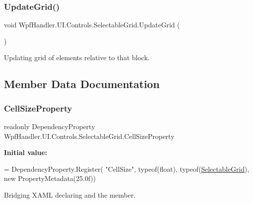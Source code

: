 \subsubsection{\texorpdfstring{Update\+Grid()}{UpdateGrid()}}
{\footnotesize\ttfamily void Wpf\+Handler.\+U\+I.\+Controls.\+Selectable\+Grid.\+Update\+Grid (\begin{DoxyParamCaption}{ }\end{DoxyParamCaption})}



Updating grid of elements relative to that block. 



\subsection{Member Data Documentation}
\mbox{\label{class_wpf_handler_1_1_u_i_1_1_controls_1_1_selectable_grid_af2a964404379788302d8cc9665bcad24}} 
\subsubsection{\texorpdfstring{Cell\+Size\+Property}{CellSizeProperty}}
{\footnotesize\ttfamily readonly Dependency\+Property Wpf\+Handler.\+U\+I.\+Controls.\+Selectable\+Grid.\+Cell\+Size\+Property\hspace{0.3cm}{\ttfamily [static]}}

{\bfseries Initial value\+:}
\begin{DoxyCode}
= DependencyProperty.Register(
            \textcolor{stringliteral}{"CellSize"}, typeof(\textcolor{keywordtype}{float}), typeof(\mbox{\hyperlink{class_wpf_handler_1_1_u_i_1_1_controls_1_1_selectable_grid_a3968411e99848235dfb6bdb7ec0f8fc5}{SelectableGrid}}), \textcolor{keyword}{new} PropertyMetadata(25.0f))
\end{DoxyCode}


Bridging X\+A\+ML declaring and the member. 

\mbox{\label{class_wpf_handler_1_1_u_i_1_1_controls_1_1_selectable_grid_a3b29cec2069df36506601778308e0c12}} 
